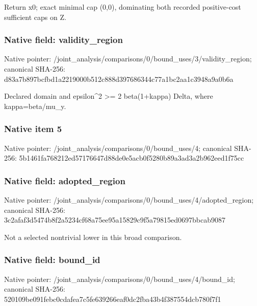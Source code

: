 \documentclass[10pt,a4paper]{article}
\begin{document}
\begingroup\raggedright\sloppy Return x0;\allowbreak{} exact minimal cap (0,\allowbreak{}0),\allowbreak{} dominating both recorded positive-cost sufficient caps on Z.\par\endgroup

\subsubsection{Native field: validity\_\allowbreak{}region}
Native pointer: /joint\_\allowbreak{}analysis/comparisons/0/bound\_\allowbreak{}uses/3/validity\_\allowbreak{}region; canonical SHA-256: d83a7b897bcfbd1a2219000b512c888d397686344c77a1bc2aa1c3948a9a0b6a

\begingroup\raggedright\sloppy Declared domain and epsilon\textasciicircum{}2 >=\allowbreak{} 2 beta(1+kappa) Delta,\allowbreak{} where kappa=\allowbreak{}beta/\allowbreak{}mu\_\allowbreak{}y.\par\endgroup

\subsubsection{Native item 5}
Native pointer: /joint\_\allowbreak{}analysis/comparisons/0/bound\_\allowbreak{}uses/4; canonical SHA-256: 5b1461fa768212ed57176647d88de0e5acb0f5280b89a3ad3a2b962eed1f75cc

\subsubsection{Native field: adopted\_\allowbreak{}region}
Native pointer: /joint\_\allowbreak{}analysis/comparisons/0/bound\_\allowbreak{}uses/4/adopted\_\allowbreak{}region; canonical SHA-256: 3c2afaf3d5474b8f2a5234cf68a75ee95a15829c9f5a79815ed0697bbcab9087

\begingroup\raggedright\sloppy Not a selected nontrivial lower in this broad comparison.\par\endgroup

\subsubsection{Native field: bound\_\allowbreak{}id}
Native pointer: /joint\_\allowbreak{}analysis/comparisons/0/bound\_\allowbreak{}uses/4/bound\_\allowbreak{}id; canonical SHA-256: 520109be091febc0cdafea7c5fe639266eaf0dc2fba43b4f387554dcb780f7f1
\end{document}
